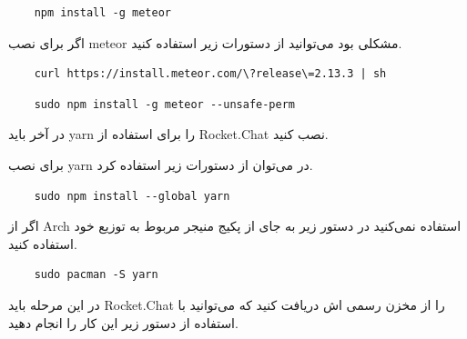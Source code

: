 \begin{latin}
    \begin{verbatim}
    npm install -g meteor
    \end{verbatim}
\end{latin}

اگر برای نصب meteor مشکلی بود می‌توانید از دستورات زیر استفاده کنید.

\begin{latin}
    \begin{verbatim}
    curl https://install.meteor.com/\?release\=2.13.3 | sh
    \end{verbatim}
\end{latin}

\begin{latin}
    \begin{verbatim}
    sudo npm install -g meteor --unsafe-perm
    \end{verbatim}
\end{latin}

در آخر باید yarn را برای استفاده از Rocket.Chat نصب کنید.

برای نصب yarn در  می‌توان از دستورات زیر استفاده کرد.

\begin{latin}
    \begin{verbatim}
    sudo npm install --global yarn 
    \end{verbatim}
\end{latin}

اگر از Arch استفاده نمی‌کنید در دستور زیر به جای  از پکیج منیجر مربوط به توزیع خود استفاده کنید.

\begin{latin}
    \begin{verbatim}
    sudo pacman -S yarn 
    \end{verbatim}
\end{latin}

در این مرحله باید Rocket.Chat را از مخزن رسمی اش دریافت کنید که می‌توانید با استفاده از دستور زیر این کار را انجام دهید.

